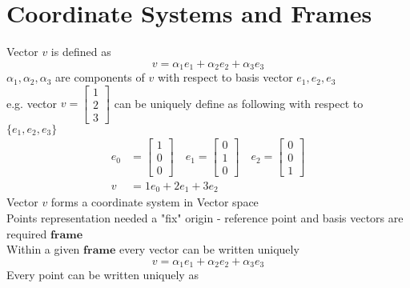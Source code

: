 \documentclass[UTF8]{article}
\begin{document}
\section{Coordinate Systems and Frames}
Vector $v$ is defined as 
\[
    v = \alpha_1 e_1 + \alpha_2 e_2 + \alpha_3 e_3
\]
$\alpha_1, \alpha_2, \alpha_3$ are components of $v$ with respect to basis vector $e_1, e_2, e_3$ \\
e.g. vector 
$v = \left[ \begin{array}{c} 
                1 \\ 
                2 \\
                3
            \end{array}
            \right]
                $
can be uniquely define as following with respect to $\{e_1, e_2, e_3\}$ 
%
\begin{equation}
\begin{aligned} 
    e_0 &= \left[ \begin{array}{c} 
                1 \\ 
                0 \\
                0 
            \end{array}
            \right] \quad 
    e_1 = \left[ \begin{array}{c} 
                0 \\ 
                1 \\
                0 
            \end{array}
            \right] \quad 
    e_2 = \left[ \begin{array}{c} 
                0 \\ 
                0 \\
                1 
            \end{array}
            \right]  \\
    v &= 1e_0 + 2e_1 + 3e_2        
\end{aligned}
\end{equation} 
Vector $v$ forms a coordinate system in Vector space \\
Points representation needed a "fix" origin - reference point and basis vectors are required $\mathbf{frame}$ \\
Within a given $\mathbf{frame}$ every vector can be written uniquely 
\[
    v = \alpha_1 e_1 + \alpha_2 e_2 + \alpha_3 e_3
\]
%
Every point can be written uniquely as \\
\end{document}
